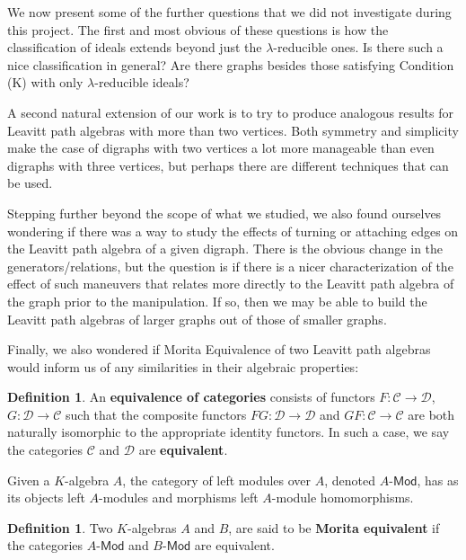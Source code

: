 \documentclass[12pt]{amsart}
\theoremstyle{plain} \numberwithin{equation}{section}
\theoremstyle{definition}
\newtheorem{definition}[theorem]{Definition}
\theoremstyle{definition}
\begin{document}
We now present some of the further questions that we did not investigate during this project. The first and most obvious of these questions is how the classification of ideals extends beyond just the $\lambda$-reducible ones. Is there such a nice classification in general? Are there graphs besides those satisfying Condition (K) with only $\lambda$-reducible ideals?

A second natural extension of our work is to try to produce analogous results for Leavitt path algebras with more than two vertices. Both symmetry and simplicity make the case of digraphs with two vertices a lot more manageable than even digraphs with three vertices, but perhaps there are different techniques that can be used.

Stepping further beyond the scope of what we studied, we also found ourselves wondering if there was a way to study the effects of turning or attaching edges on the Leavitt path algebra of a given digraph. There is the obvious change in the generators/relations, but the question is if there is a nicer characterization of the effect of such maneuvers that relates more directly to the Leavitt path algebra of the graph prior to the manipulation. If so, then we may be able to build the Leavitt path algebras of larger graphs out of those of smaller graphs. 

Finally, we also wondered if Morita Equivalence of two Leavitt path algebras would inform us of any similarities in their algebraic properties:

\begin{definition}
    An \textbf{equivalence of categories} consists of functors $F : \mathcal{C} \to \mathcal{D}$, $G : \mathcal{D} \to \mathcal{C}$ such that the composite functors $FG : \mathcal{D} \to \mathcal{D}$ and $GF : \mathcal{C} \to \mathcal{C}$ are both naturally isomorphic to the appropriate identity functors. In such a case, we say the categories $\mathcal{C}$ and $\mathcal{D}$ are \textbf{equivalent}. 
\end{definition}

Given a $K$-algebra $A$, the category of left modules over $A$, denoted $A\text{-}\mathsf{Mod}$, has as its objects left $A$-modules and morphisms left $A$-module homomorphisms. 

\begin{definition}
    Two $K$-algebras $A$ and $B$, are said to be \textbf{Morita equivalent} if the categories $A\text{-}\mathsf{Mod}$ and $B\text{-}\mathsf{Mod}$ are equivalent. 
\end{definition}
\end{document}
